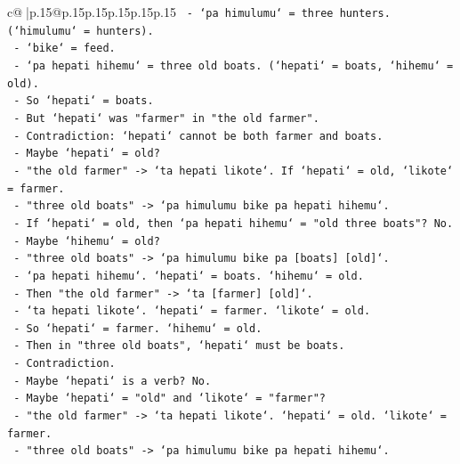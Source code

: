 \documentclass{article}
\begin{document}
{\begin{supertabular}{c@{$\;$}|p{.15\linewidth}@{}p{.15\linewidth}p{.15\linewidth}p{.15\linewidth}p{.15\linewidth}p{.15\linewidth}}
{{{\texttt{                {-} `pa himulumu` = three hunters. (`himulumu` = hunters).} \\
\texttt{                {-} `bike` = feed.} \\
\texttt{                {-} `pa hepati hihemu` = three old boats. (`hepati` = boats, `hihemu` = old).} \\
\texttt{                {-} So `hepati` = boats.} \\
\texttt{                {-} But `hepati` was "farmer" in "the old farmer".} \\
\texttt{                {-} Contradiction: `hepati` cannot be both farmer and boats.} \\
\texttt{                {-} Maybe `hepati` = old?} \\
\texttt{                {-} "the old farmer" {-}> `ta hepati likote`. If `hepati` = old, `likote` = farmer.} \\
\texttt{                {-} "three old boats" {-}> `pa himulumu bike pa hepati hihemu`.} \\
\texttt{                {-} If `hepati` = old, then `pa hepati hihemu` = "old three boats"? No.} \\
\texttt{                {-} Maybe `hihemu` = old?} \\
\texttt{                {-} "three old boats" {-}> `pa himulumu bike pa {[}boats{]} {[}old{]}`.} \\
\texttt{                {-} `pa hepati hihemu`. `hepati` = boats. `hihemu` = old.} \\
\texttt{                {-} Then "the old farmer" {-}> `ta {[}farmer{]} {[}old{]}`.} \\
\texttt{                {-} `ta hepati likote`. `hepati` = farmer. `likote` = old.} \\
\texttt{                {-} So `hepati` = farmer. `hihemu` = old.} \\
\texttt{                {-} Then in "three old boats", `hepati` must be boats.} \\
\texttt{                {-} Contradiction.} \\
\texttt{                {-} Maybe `hepati` is a verb? No.} \\
\texttt{                {-} Maybe `hepati` = "old" and `likote` = "farmer"?} \\
\texttt{                {-} "the old farmer" {-}> `ta hepati likote`. `hepati` = old. `likote` = farmer.} \\
\texttt{                {-} "three old boats" {-}> `pa himulumu bike pa hepati hihemu`.} \\
}}}
\end{supertabular}}
\end{document}
